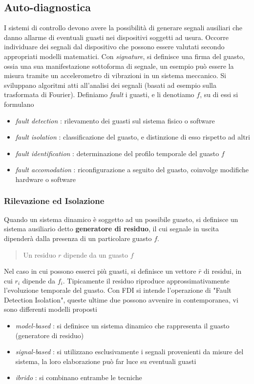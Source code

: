 \documentclass[10pt, letterpaper]{report}
\begin{document}
\subsection{Auto-diagnostica}
I sistemi di controllo devono avere la possibilità di generare segnali ausiliari che danno allarme di eventuali guasti 
nei dispositivi soggetti ad usura. Occorre individuare dei segnali dal dispositivo che possono essere 
valutati secondo appropriati modelli matematici. \acc 
Con \textit{signature}, si definisce una firma del guasto, ossia una sua manifestazione sottoforma di segnale, un esempio 
può essere la misura tramite un accelerometro di vibrazioni in un sistema meccanico. Si sviluppano algoritmi atti 
all'analisi dei segnali (basati ad esempio sulla trasformata di Fourier).\acc 
Definiamo \textit{fault} i guasti, e li denotiamo $f$, su di essi si formulano\begin{itemize}
    \item \textit{fault detection} : rilevamento dei guasti sul sistema fisico o software 
    \item \textit{fault isolation} : classificazione del guasto, e distinzione di esso rispetto ad altri 
    \item \textit{fault identification} : determinazione del profilo temporale del guasto $f$ 
    \item \textit{fault accomodation} : riconfigurazione a seguito del guasto, coinvolge modifiche hardware o software
\end{itemize}
\subsubsection{Rilevazione ed Isolazione }
Quando un sistema dinamico è soggetto ad un possibile guasto, si definisce un sistema ausiliario detto 
\textbf{generatore di residuo}, il cui segnale in uscita dipenderà dalla presenza di un particolare guasto 
$f$. \begin{quote}
    Un residuo $r$ dipende da un guasto $f$
\end{quote}
Nel caso in cui possono esserci più guasti, si definisce un vettore $\bar r$ di residui, in cui $r_i$ dipende 
da $f_i$. Tipicamente il residuo riproduce approssimativamente  l'evoluzione temporale del guasto. Con FDI si intende l'operazione 
di "Fault Detection Isolation", queste ultime due possono avvenire in contemporanea, vi sono differenti modelli proposti\begin{itemize}
    \item \textit{model-based} : si definisce un sistema dinamico che rappresenta il guasto (generatore di residuo)
    \item \textit{signal-based} : si utilizzano esclusivamente i segnali provenienti da misure del sistema, la loro 
    elaborazione può far luce su eventuali guasti 
    \item \textit{ibrido} : si combinano entrambe le tecniche
\end{itemize}
\end{document}
